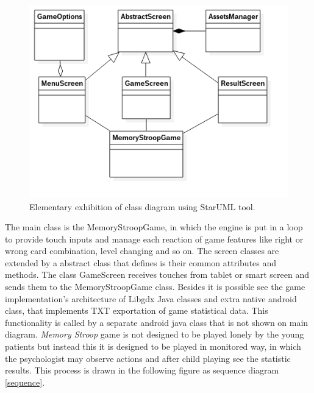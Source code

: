 				\begin{figure}[htp]
					\begin{center}
						\includegraphics[scale=0.65]{chapters/desenvolvimento/img/uml_2.png}
						\caption{Elementary exhibition of class diagram using StarUML tool.}
						\label{uml}
					\end{center}
				\end{figure}
		
The main class is the MemoryStroopGame, in which the engine is put in a loop to provide touch inputs and manage each reaction of game features like right or wrong card combination, level changing and so on. The screen classes are extended by a abstract class that defines is their common attributes and methods. The class GameScreen receives touches from tablet or smart screen and sends them to the MemoryStroopGame class. Besides it is possible see the game implementation's architecture of Libgdx Java classes and extra native android class, that implements TXT exportation of game statistical data. This functionality is called by a separate android java class that is not shown on main diagram. \textit{Memory Stroop} game is not designed to be played lonely by the young patients but instead this it is designed to be played in monitored way, in which the psychologist may observe actions and after child playing see the statistic results. This process is drawn in the following figure as sequence diagram \ref{sequence}.
		
